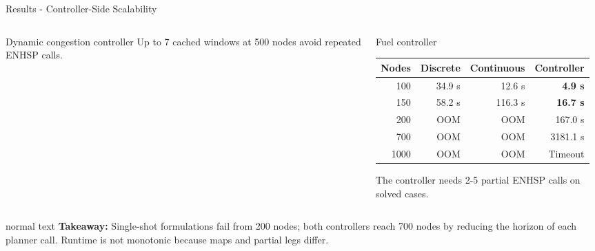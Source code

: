 \documentclass[10pt,aspectratio=169]{beamer}
\newcommand{\takeaway}[1]{%
  \begin{beamercolorbox}[rounded=true,sep=0.65ex,wd=\linewidth]{normal text}%
    \textbf{Takeaway:} #1
  \end{beamercolorbox}%
}
\begin{document}
\begin{frame}{Results - Controller-Side Scalability}
\begin{columns}[T,onlytextwidth]
\begin{column}{0.49\textwidth}
\begin{beamerboxesrounded}[upper=block title,lower=block body,shadow=true]{Dynamic congestion controller}
        \vspace{0.20cm}
        Up to 7 cached windows at 500 nodes avoid repeated ENHSP calls.
      \end{beamerboxesrounded}
    \end{column}
    \begin{column}{0.49\textwidth}
      \begin{beamerboxesrounded}[upper=block title,lower=block body,shadow=true]{Fuel controller}
        \centering\scriptsize
        \begin{tabular}{@{}r r r r@{}}
          \toprule
          Nodes & Discrete & Continuous & Controller \\
          \midrule
          100  & 34.9 s & 12.6 s  & \textbf{4.9 s} \\
          150  & 58.2 s & 116.3 s & \textbf{16.7 s} \\
          200  & \textcolor{RoutlyRed}{OOM} & \textcolor{RoutlyRed}{OOM} & 167.0 s \\
          700  & \textcolor{RoutlyRed}{OOM} & \textcolor{RoutlyRed}{OOM} & 3181.1 s \\
          1000 & \textcolor{RoutlyRed}{OOM} & \textcolor{RoutlyRed}{OOM} & Timeout \\
          \bottomrule
        \end{tabular}

        \vspace{0.20cm}
        The controller needs 2-5 partial ENHSP calls on solved cases.
      \end{beamerboxesrounded}
    \end{column}
  \end{columns}

  \vspace{0.32cm}
  \takeaway{Single-shot formulations fail from 200 nodes; both controllers reach 700 nodes by reducing the horizon of each planner call. Runtime is not monotonic because maps and partial legs differ.}
\end{frame}
\end{document}
